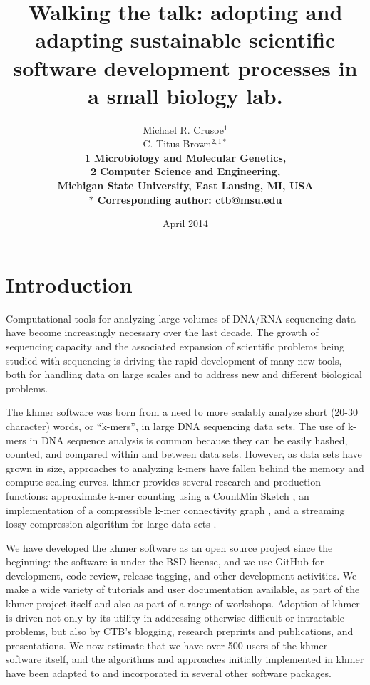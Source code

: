 \documentclass[12pt]{article}
\date{April 2014}
\title{Walking the talk: adopting and adapting sustainable scientific software
  development processes in a small biology lab.}
\author{Michael R. Crusoe$^{1}$\\
C. Titus Brown$^{2,1\ast}$\\
\small \bf{1} Microbiology and Molecular Genetics,\\
\small \bf{2} Computer Science and Engineering,\\
\small Michigan State University, East Lansing, MI, USA\\
\small $\ast$ Corresponding author: ctb@msu.edu}
\begin{document}
\maketitle
\thispagestyle{firststyle}



\setlength{\parindent}{0pt}
\setlength{\parindent}{0pt}
\setlength{\parskip}{0.70ex}

\section{Introduction}

Computational tools for analyzing large volumes of DNA/RNA sequencing data
have become increasingly necessary over the last decade.  The growth
of sequencing capacity and the associated expansion of scientific
problems being studied with sequencing is driving the rapid development of
many new tools, both for handling data on large scales and to address
new and different biological problems.

The khmer software was born from a need to more scalably analyze short
(20-30 character) words, or ``k-mers'', in large DNA sequencing data
sets. The use of k-mers in DNA sequence analysis is common because
they can be easily hashed, counted, and compared within and between
data sets.  However, as data sets have grown in size, approaches to
analyzing k-mers have fallen behind the memory and compute scaling
curves.  khmer provides several research and production functions:
approximate k-mer counting using a CountMin Sketch
\cite{Zhang2013}, an implementation of a compressible k-mer
connectivity graph \cite{Pell2012}, and a streaming lossy compression
algorithm for large data sets \cite{Brown2012}.

We have developed the khmer software as an open source project since
the beginning: the software is under the BSD license, and we use
GitHub for development, code review, release tagging, and other
development activities.  We make a wide variety of tutorials and
user documentation available, as part of the khmer project itself and
also as part of a range of workshops.  Adoption of khmer is driven not only by
its utility in addressing otherwise difficult or intractable problems,
but also by CTB's blogging, research preprints and publications, and
presentations.  We now estimate that we have over 500 users of the
khmer software itself, and the algorithms and approaches initially
implemented in khmer have been adapted to and incorporated in several other
software packages.
\end{document}
